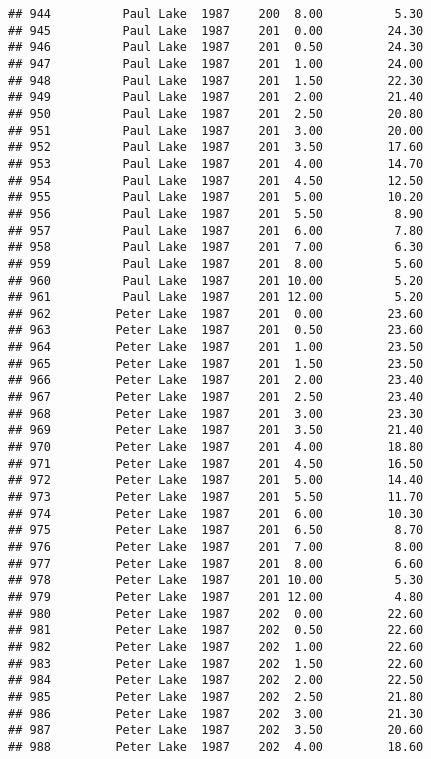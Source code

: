\documentclass[
]{article}
\begin{document}
\begin{verbatim}
## 944          Paul Lake  1987    200  8.00          5.30
## 945          Paul Lake  1987    201  0.00         24.30
## 946          Paul Lake  1987    201  0.50         24.30
## 947          Paul Lake  1987    201  1.00         24.00
## 948          Paul Lake  1987    201  1.50         22.30
## 949          Paul Lake  1987    201  2.00         21.40
## 950          Paul Lake  1987    201  2.50         20.80
## 951          Paul Lake  1987    201  3.00         20.00
## 952          Paul Lake  1987    201  3.50         17.60
## 953          Paul Lake  1987    201  4.00         14.70
## 954          Paul Lake  1987    201  4.50         12.50
## 955          Paul Lake  1987    201  5.00         10.20
## 956          Paul Lake  1987    201  5.50          8.90
## 957          Paul Lake  1987    201  6.00          7.80
## 958          Paul Lake  1987    201  7.00          6.30
## 959          Paul Lake  1987    201  8.00          5.60
## 960          Paul Lake  1987    201 10.00          5.20
## 961          Paul Lake  1987    201 12.00          5.20
## 962         Peter Lake  1987    201  0.00         23.60
## 963         Peter Lake  1987    201  0.50         23.60
## 964         Peter Lake  1987    201  1.00         23.50
## 965         Peter Lake  1987    201  1.50         23.50
## 966         Peter Lake  1987    201  2.00         23.40
## 967         Peter Lake  1987    201  2.50         23.40
## 968         Peter Lake  1987    201  3.00         23.30
## 969         Peter Lake  1987    201  3.50         21.40
## 970         Peter Lake  1987    201  4.00         18.80
## 971         Peter Lake  1987    201  4.50         16.50
## 972         Peter Lake  1987    201  5.00         14.40
## 973         Peter Lake  1987    201  5.50         11.70
## 974         Peter Lake  1987    201  6.00         10.30
## 975         Peter Lake  1987    201  6.50          8.70
## 976         Peter Lake  1987    201  7.00          8.00
## 977         Peter Lake  1987    201  8.00          6.60
## 978         Peter Lake  1987    201 10.00          5.30
## 979         Peter Lake  1987    201 12.00          4.80
## 980         Peter Lake  1987    202  0.00         22.60
## 981         Peter Lake  1987    202  0.50         22.60
## 982         Peter Lake  1987    202  1.00         22.60
## 983         Peter Lake  1987    202  1.50         22.60
## 984         Peter Lake  1987    202  2.00         22.50
## 985         Peter Lake  1987    202  2.50         21.80
## 986         Peter Lake  1987    202  3.00         21.30
## 987         Peter Lake  1987    202  3.50         20.60
## 988         Peter Lake  1987    202  4.00         18.60

\end{verbatim}
\end{document}
